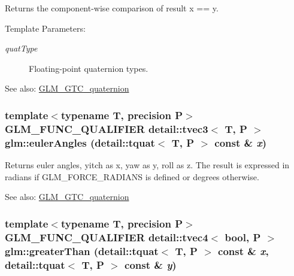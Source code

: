 Returns the component-wise comparison of result x == y.

\begin{Desc}
\item[Template Parameters:]
\begin{description}
\item[{\em quatType}]Floating-point quaternion types.\end{description}
\end{Desc}
\begin{Desc}
\item[See also:]\hyperlink{group__gtc__quaternion}{GLM\_\-GTC\_\-quaternion} \end{Desc}
\hypertarget{group__gtc__quaternion_gb7f90472a816598e7bc7b3606dbadcac}{
\subsubsection[eulerAngles]{\setlength{\rightskip}{0pt plus 5cm}template$<$typename T, precision P$>$ GLM\_\-FUNC\_\-QUALIFIER detail::tvec3$<$ T, P $>$ glm::eulerAngles (detail::tquat$<$ T, P $>$ const \& {\em x})}}
\label{group__gtc__quaternion_gb7f90472a816598e7bc7b3606dbadcac}


Returns euler angles, yitch as x, yaw as y, roll as z. The result is expressed in radians if GLM\_\-FORCE\_\-RADIANS is defined or degrees otherwise.

\begin{Desc}
\item[See also:]\hyperlink{group__gtc__quaternion}{GLM\_\-GTC\_\-quaternion} \end{Desc}
\hypertarget{group__gtc__quaternion_g1ee107eeb1b58dcc19bd56b119b7e14e}{
\subsubsection[greaterThan]{\setlength{\rightskip}{0pt plus 5cm}template$<$typename T, precision P$>$ GLM\_\-FUNC\_\-QUALIFIER detail::tvec4$<$ bool, P $>$ glm::greaterThan (detail::tquat$<$ T, P $>$ const \& {\em x}, \/  detail::tquat$<$ T, P $>$ const \& {\em y})}}
\label{group__gtc__quaternion_g1ee107eeb1b58dcc19bd56b119b7e14e}


